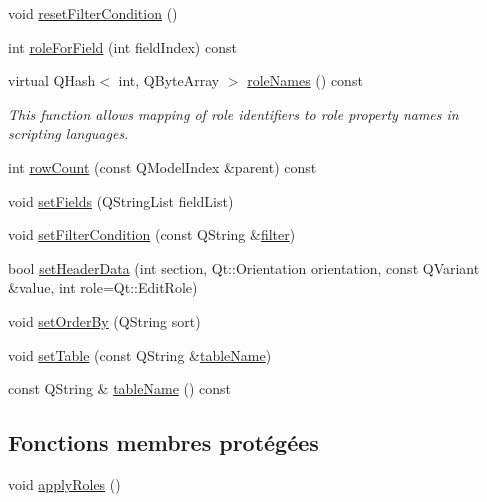 \begin{DoxyCompactItemize}
\item 
void \hyperlink{classSH__SqlDataModel_a0bf147a87376fc3aa436562f94661679}{reset\-Filter\-Condition} ()
\item 
int \hyperlink{classSH__SqlDataModel_aa487bb763eaf2544e4eb5822cd666105}{role\-For\-Field} (int field\-Index) const 
\item 
virtual Q\-Hash$<$ int, Q\-Byte\-Array $>$ \hyperlink{classSH__SqlDataModel_ac9954bbf92ed14566128c74318e3125b}{role\-Names} () const 
\begin{DoxyCompactList}\small\item\em This function allows mapping of role identifiers to role property names in scripting languages. \end{DoxyCompactList}\item 
int \hyperlink{classSH__SqlDataModel_a48d361600552aa4f80af693a68fc41dd}{row\-Count} (const Q\-Model\-Index \&parent) const 
\item 
void \hyperlink{classSH__SqlDataModel_ad297d359375d55e66493ce8935f8ff05}{set\-Fields} (Q\-String\-List field\-List)
\item 
void \hyperlink{classSH__SqlDataModel_a99c6317027a7c9f723215b53b69e0647}{set\-Filter\-Condition} (const Q\-String \&\hyperlink{classSH__SqlDataModel_a1f3b35273198f9c67ca4bca5b29876e9}{filter})
\item 
bool \hyperlink{classSH__SqlDataModel_aae31b72ec89a35a7b8d4175d7bcaa33a}{set\-Header\-Data} (int section, Qt\-::\-Orientation orientation, const Q\-Variant \&value, int role=Qt\-::\-Edit\-Role)
\item 
void \hyperlink{classSH__SqlDataModel_ab443cd7935993270c37f9bd977b33875}{set\-Order\-By} (Q\-String sort)
\item 
void \hyperlink{classSH__SqlDataModel_a2c09d14926326a1149c1df7856c9879c}{set\-Table} (const Q\-String \&\hyperlink{classSH__SqlDataModel_afced07f7b9e6fecd349a5428a1a4615e}{table\-Name})
\item 
const Q\-String \& \hyperlink{classSH__SqlDataModel_afced07f7b9e6fecd349a5428a1a4615e}{table\-Name} () const 
\end{DoxyCompactItemize}
\subsection*{Fonctions membres protégées}
\begin{DoxyCompactItemize}
\item 
void \hyperlink{classSH__SqlDataModel_ad4f032ceb7c2f70b2d7388e3afd161ab}{apply\-Roles} ()
\end{DoxyCompactItemize}
